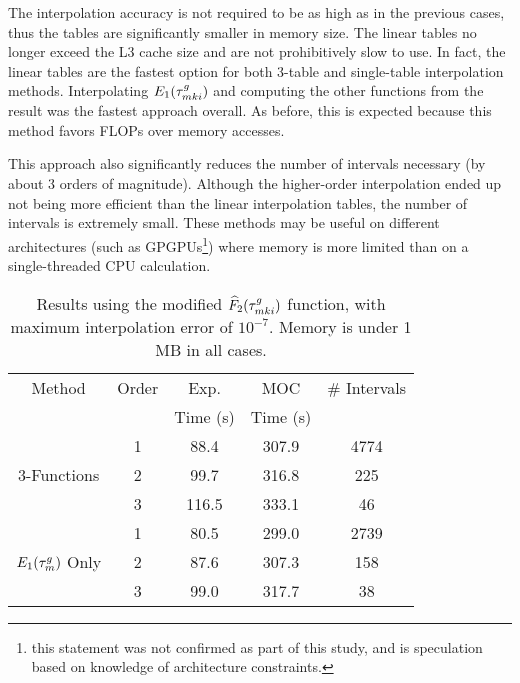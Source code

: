 {{{{        The interpolation accuracy is not required to be as high as in the previous cases, thus the tables are significantly smaller in memory size.
        The linear tables no longer exceed the L3 cache size and are not prohibitively slow to use.
        In fact, the linear tables are the fastest option for both 3-table and single-table interpolation methods.
        Interpolating $E_1(\segopt)$ and computing the other functions from the result was the fastest approach overall.
        As before, this is expected because this method favors \acp{FLOP} over memory accesses.

        This approach also significantly reduces the number of intervals necessary (by about 3 orders of magnitude).
        Although the higher-order interpolation ended up not being more efficient than the linear interpolation tables, the number of intervals is extremely small.
        These methods may be useful on different architectures (such as \acp{GPGPU}\footnote{this statement was not confirmed as part of this study, and is speculation based on knowledge of architecture constraints.}) where memory is more limited than on a single-threaded \ac{CPU} calculation.

        \begin{table}
          \centering
          \caption{Results using the modified $\modFunc$ function, with maximum interpolation error of $10^{-7}$. Memory is under 1 MB in all cases.}
          \label{tab:LSMOC:ET:Final Results}
          \begin{tabular}{@{}ccccc@{}}\toprule
            Method & Order & Exp.     & \ac{MOC}& \# Intervals \\
                   &       & Time (s) & Time (s) & \\\midrule
            \multirow{3}{*}{3-Functions}      & 1 &  88.4 & 307.9 & 4774\\
                                              & 2 &  99.7 & 316.8 &  225\\
                                              & 3 & 116.5 & 333.1 &   46\\\midrule
            \multirow{3}{*}{$E_1(\opt)$ Only} & 1 &  80.5 & 299.0 & 2739\\
                                              & 2 &  87.6 & 307.3 &  158\\
                                              & 3 &  99.0 & 317.7 &   38\\\bottomrule
          \end{tabular}
        \end{table}
      }
    }
}}
